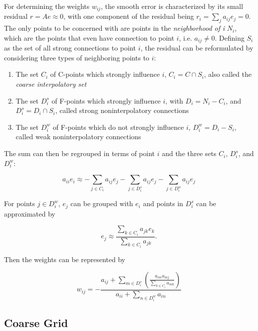 For determining the weights $w_{ij}$, the smooth error is characterized by its small residual $r = Ae \approx 0$, with one component of the residual being $r_i = \sum_{j}{a_{ij}e_j} = 0$. The only points to be concerned with are points in the \emph{neighborhood of i} $N_i$, which are the points that even have connection to point $i$, i.e. $a_{ij} \neq 0$. Defining $S_i$ as the set of all strong connections to point $i$, the residual can be reformulated by considering three types of neighboring points to $i$:
\begin{enumerate}
	\item The set $C_i$ of C-points which strongly influence $i$, $C_i = C \cap S_i$, also called the \emph{coarse interpolatory set}
	\item The set $D_i^s$ of F-points which strongly influence $i$, with $D_i = N_i - C_i$, and $D_i^s = D_i \cap S_i$, called strong noninterpolatory connections
	\item The set $D_i^w$ of F-points which do not strongly influence $i$, $D_i^w = D_i - S_i$, called weak noninterpolatory connections
\end{enumerate}

The sum can then be regrouped in terms of point $i$ and the three sets $C_i$, $D_i^s$, and $D_i^w$:

\begin{equation}
	a_{ii}e_i \approx -\sum_{j \in C_i}{a_{ij}e_j} - \sum_{j \in D_i^s}{a_{ij}e_j} - \sum_{j \in D_i^w}{a_{ij}e_j}
\end{equation}

For points $j \in D_i^w$, $e_j$ can be grouped with $e_i$ and points in $D_i^s$ can be approximated by 

\begin{equation}
	e_j \approx \frac{\displaystyle \sum_{k \in C_i}{a_{jk}e_k}}{\displaystyle \sum_{k \in C_i}{a_{jk}}}.
	\label{ej_approx}
\end{equation}

Then the weights can be represented by

\begin{equation}
	w_{ij} = - \frac{a_{ij} + \displaystyle \sum_{m \in D_i^s}{\left(\frac{a_{im}a_{mj}}{\displaystyle \sum_{k \in C_i}{a_{mk}}}\right)}}{a_{ii} + \displaystyle \sum_{n \in D_i^w}{a_{in}}}
\end{equation}

\subsection{Coarse Grid} %

